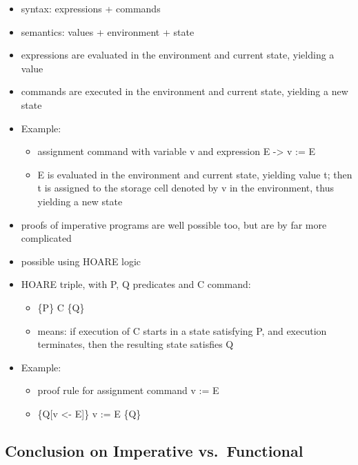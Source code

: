 \begin{itemize}
\tightlist
\item
  syntax: expressions + commands
\item
  semantics: values + environment + state
\item
  expressions are evaluated in the environment and current state,
  yielding a value
\item
  commands are executed in the environment and current state, yielding a
  new state
\item
  Example:

  \begin{itemize}
  \tightlist
  \item
    assignment command with variable v and expression E -\textgreater{}
    v := E
  \item
    E is evaluated in the environment and current state, yielding value
    t; then t is assigned to the storage cell denoted by v in the
    environment, thus yielding a new state
  \end{itemize}
\item
  proofs of imperative programs are well possible too, but are by far
  more complicated
\item
  possible using HOARE logic
\item
  HOARE triple, with P, Q predicates and C command:

  \begin{itemize}
  \tightlist
  \item
    \{P\} C \{Q\}
  \item
    means: if execution of C starts in a state satisfying P, and
    execution terminates, then the resulting state satisfies Q
  \end{itemize}
\item
  Example:

  \begin{itemize}
  \tightlist
  \item
    proof rule for assignment command v := E
  \item
    \{Q{[}v \textless{}- E{]}\} v := E \{Q\}
  \end{itemize}
\end{itemize}

\hypertarget{conclusion-on-imperative-vs.functional}{%
\subsection{Conclusion on Imperative
vs.~Functional}\label{conclusion-on-imperative-vs.functional}}

